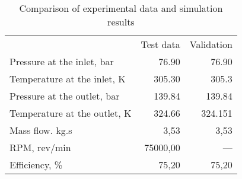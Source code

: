 \begin{table}
\label{tab:Comparison2}
\caption{Comparison of experimental data and simulation results}
\begin{center}
\begin{tabulary}{0.9\textwidth}{LRR}

	&	Test data \cite{Rinaldi_2013}	&	Validation	\\
Pressure at the inlet, bar	&	76.90	&	76.90	\\
Temperature at the inlet, K	&	305.30	&	305.3	\\
Pressure at the outlet, bar	&	139.84	&	139.84	\\
Temperature at the outlet, K	&	324.66	&	324.151	\\
Mass flow. kg.s	&	3,53	&	3,53	\\
RPM, rev/min	&	75000,00	&	—	\\
Efficiency, \%	&	75,20	&	75,20	\\

\end{tabulary}
\end{center}
\end{table}